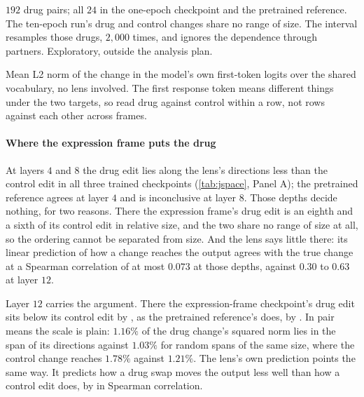 \begin{table}[htbp]
\begin{fullwidth}
\begin{threeparttable}
\begin{tablenotes}
$192$ drug pairs; all $24$ in the one-epoch checkpoint and the pretrained
reference. The ten-epoch run's drug and control changes share no range of
size. The interval resamples those drugs, $2{,}000$ times, and ignores the
dependence through partners. Exploratory, outside the analysis plan.
\item[f] Mean L2 norm of the change in the model's own first-token logits over
the shared vocabulary, no lens involved. The first response token means
different things under the two targets, so read drug against control within a
row, not rows against each other across frames.
\end{tablenotes}
\end{threeparttable}
\end{fullwidth}
\end{table}

\paragraph{Where the expression frame puts the drug} At layers $4$ and $8$ the
drug edit lies along the lens's directions less than the control edit in all
three trained checkpoints (\cref{tab:jspace}, Panel A); the pretrained reference
agrees at layer $4$ and is inconclusive at layer $8$. Those depths decide
nothing, for two reasons. There the expression frame's drug edit is an eighth
and a sixth of its control edit in relative size, and the two share no range of
size at all, so the ordering cannot be separated from size. And the lens says
little there: its linear prediction of how a change reaches the output agrees
with the true change at a Spearman correlation of at most $0.073$ at those
depths, against $0.30$ to $0.63$ at layer $12$.

Layer $12$ carries the argument. There the expression-frame checkpoint's drug
edit sits below its control edit by , as the
pretrained reference's does, by . In pair means
the scale is plain: $1.16\%$ of the drug change's squared norm lies in the span
of its directions against $1.03\%$ for random spans of the same size, where the
control change reaches $1.78\%$ against $1.21\%$. The lens's own prediction points the same way. It predicts how a drug swap moves the output less well than how a
control edit does, by  in Spearman correlation.

